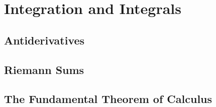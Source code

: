 \chapter{Integration and Integrals}

\section{Antiderivatives}

\section{Riemann Sums}

\section{The Fundamental Theorem of Calculus}
